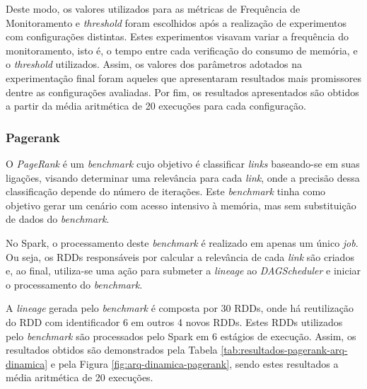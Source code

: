Deste modo, os valores utilizados para as métricas de Frequência de Monitoramento e \textit{threshold} foram escolhidos após a realização de experimentos com configurações distintas. Estes experimentos visavam variar a frequência do monitoramento, isto é, o tempo entre cada verificação do consumo de memória, e o \textit{threshold} utilizados. Assim, os valores dos parâmetros adotados na experimentação final foram aqueles que apresentaram resultados mais promissores dentre as configurações avaliadas. Por fim, os resultados apresentados são obtidos a partir da média aritmética de 20 execuções para cada configuração. 

\subsubsection{Pagerank}
O \textit{PageRank} é um \textit{benchmark} cujo objetivo é classificar \textit{links} baseando-se em suas ligações, visando determinar uma relevância para cada \textit{link}, onde a precisão dessa classificação depende do número de iterações. Este \textit{benchmark} tinha como objetivo gerar um cenário com acesso intensivo à memória, mas sem substituição de dados do \textit{benchmark}.

No Spark, o processamento deste \textit{benchmark} é realizado em apenas um único \textit{job}. Ou seja, os RDDs responsáveis por calcular a relevância de cada \textit{link} são criados e, ao final, utiliza-se uma ação para submeter a \textit{lineage} ao \textit{DAGScheduler} e iniciar o processamento do \textit{benchmark}.

A \textit{lineage} gerada pelo \textit{benchmark} é composta por 30 RDDs, onde há reutilização do RDD com identificador 6 em outros 4 novos RDDs. Estes RDDs utilizados pelo \textit{benchmark} são processados pelo Spark em 6 estágios de execução. Assim, os resultados obtidos são demonstrados pela Tabela \ref{tab:resultados-pagerank-arq-dinamica} e pela Figura \ref{fig:arq-dinamica-pagerank}, sendo estes resultados a média aritmética de 20 execuções.


